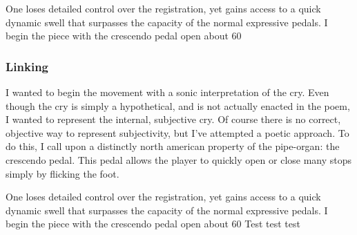 \documentclass[12pt,twoside,maitrise]{dms}
\theoremstyle{definition}
\numberwithin{equation}{section}
\numberwithin{table}{chapter}
\numberwithin{figure}{chapter}
\begin{document}
One loses detailed control over the registration, yet gains access to a quick dynamic swell that surpasses the capacity of the normal expressive pedals. I begin the piece with the crescendo pedal open about 60%

\subsubsection{Linking}

I wanted to begin the movement with a sonic interpretation of the cry. Even though the cry is simply a hypothetical, and is not actually enacted in the poem, I wanted to represent the internal, subjective cry. Of course there is no correct, objective way to represent subjectivity, but I've attempted a poetic approach. To do this, I call upon a distinctly north american property of the pipe-organ: the crescendo pedal. This pedal allows the player to quickly open or close many stops simply by flicking the foot. 

One loses detailed control over the registration, yet gains access to a quick dynamic swell that surpasses the capacity of the normal expressive pedals. I begin the piece with the crescendo pedal open about 60%
Test test test
\end{document}
